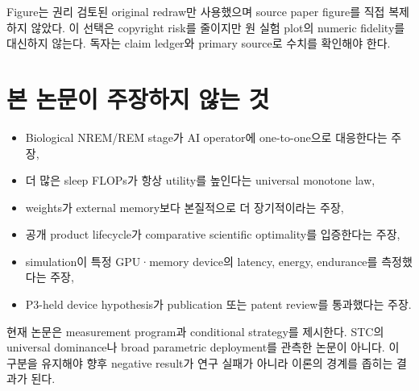 Figure는 권리 검토된 original redraw만 사용했으며 source paper figure를 직접 복제하지 않았다. 이
선택은 copyright risk를 줄이지만 원 실험 plot의 numeric fidelity를 대신하지 않는다. 독자는 claim
ledger와 primary source로 수치를 확인해야 한다.

\section{본 논문이 주장하지 않는 것}

\begin{itemize}
  \item Biological NREM/REM stage가 AI operator에 one-to-one으로 대응한다는 주장,
  \item 더 많은 sleep FLOPs가 항상 utility를 높인다는 universal monotone law,
  \item weights가 external memory보다 본질적으로 더 장기적이라는 주장,
  \item 공개 product lifecycle가 comparative scientific optimality를 입증한다는 주장,
  \item simulation이 특정 GPU·memory device의 latency, energy, endurance를 측정했다는 주장,
  \item P3-held device hypothesis가 publication 또는 patent review를 통과했다는 주장.
\end{itemize}

\begin{cautionbox}[가장 중요한 한계]
현재 논문은 measurement program과 conditional strategy를 제시한다. STC의 universal dominance나 broad
parametric deployment를 관측한 논문이 아니다. 이 구분을 유지해야 향후 negative result가 연구 실패가
아니라 이론의 경계를 좁히는 결과가 된다.
\end{cautionbox}
